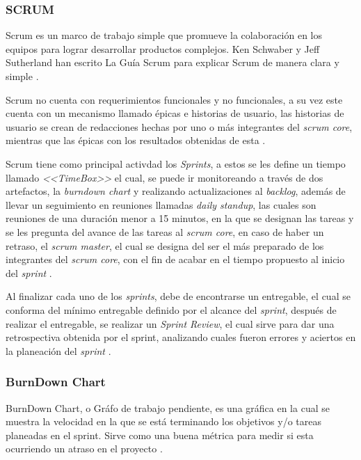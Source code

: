 \documentclass[10pt]{article}
\begin{document}
\subsubsection{SCRUM}
Scrum es un marco de trabajo simple que promueve la colaboración en los equipos para lograr desarrollar productos complejos. Ken Schwaber y Jeff Sutherland han escrito La Guía Scrum para explicar Scrum de manera clara y simple \cite{IEEEreferencias:Ref21}. \newline

\setlength{\parskip}{2mm}

Scrum no cuenta con requerimientos funcionales y no funcionales, a su vez este cuenta con un mecanismo llamado épicas e historias de usuario, las historias de usuario se crean de redacciones hechas por uno o más integrantes del \textit{scrum core}, mientras que las épicas con los resultados obtenidas de esta \cite{IEEEreferencias:Ref21}.\newline

\setlength{\parskip}{2mm}

Scrum tiene como principal activdad los \textit{Sprints}, a estos se les define un tiempo llamado \textit{<<TimeBox>>} el cual, se puede ir monitoreando a través de dos artefactos, la \textit{burndown chart} y realizando actualizaciones al \textit{backlog}, además de llevar un seguimiento en reuniones llamadas \textit{daily standup}, las cuales son reuniones de una duración menor a 15 minutos, en la que se designan las tareas y se les pregunta del avance de las tareas al \textit{scrum core}, en caso de haber un retraso, el \textit{scrum master}, el cual se designa del ser el más preparado de los integrantes del \textit{scrum core}, con el fin de acabar en el tiempo propuesto al inicio del \textit{sprint} \cite{IEEEreferencias:Ref21}.\newline

\setlength{\parskip}{2mm}

Al finalizar cada uno de los \textit{sprints}, debe de encontrarse un entregable, el cual se conforma del mínimo entregable definido por el alcance del \textit{sprint}, después de realizar el entregable, se realizar un \textit{Sprint Review}, el cual sirve para dar una retrospectiva obtenida por el sprint, analizando cuales fueron errores y aciertos en la planeación del \textit{sprint} \cite{IEEEreferencias:Ref21}.\newline

\subsubsection{BurnDown Chart}
BurnDown Chart, o Gráfo de trabajo pendiente, es una gráfica en la cual se muestra la velocidad en la que se está terminando los objetivos y/o tareas planeadas en el sprint. Sirve como una buena métrica para medir si esta ocurriendo un atraso en el proyecto \cite{IEEEreferencias:Ref22}.
\end{document}
